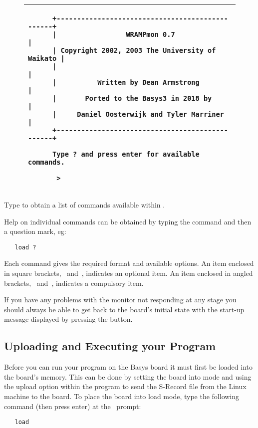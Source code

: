 \begin{figure}[h]
\begin{center}
\begin{tabular}{|p{15cm}|}
\hline
\begin{verbatim}
      +------------------------------------------------+
      |                 WRAMPmon 0.7                   |
      | Copyright 2002, 2003 The University of Waikato |
      |                                                |
      |          Written by Dean Armstrong             |
      |       Ported to the Basys3 in 2018 by          |
      |     Daniel Oosterwijk and Tyler Marriner       |
      +------------------------------------------------+
      
      Type ? and press enter for available commands.
      
       > 
\end{verbatim}
\\
\hline
\end{tabular}
\end{center}

\caption{\WRAMPmon}
\label{wrampmon}
\end{figure}

Type  to obtain a list of commands available within \WRAMPmon.

Help on individual commands can be obtained by typing the command and then a 
question mark, eg:
\begin{verbatim}
   load ?
\end{verbatim}

Each command gives the required format and available options.
An item enclosed in square brackets, \src{[}~and~\src{]},
indicates an optional item. An item enclosed in angled brackets, 
\src{<}~and~\src{>}, indicates a compulsory item.

If you have any problems with the monitor not responding at any stage you 
should always be able to get back to the board's initial state with the
start-up message displayed by pressing the  button.

\subsection{Uploading and Executing your Program}
Before you can run your program on the Basys board it must first be loaded
into the board's memory. This can be done by setting the board into 
mode and using the upload option within the  program to send
the S-Record file from the Linux machine to the board. To place the board
into load mode, type the following command (then press enter) at the
\WRAMPmon\ prompt:
\begin{verbatim}
   load
\end{verbatim}

